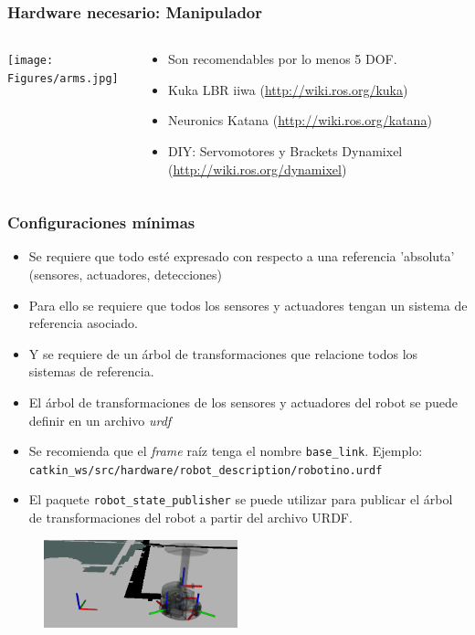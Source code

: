 \documentclass[10pt,spanish,aspectratio=1610]{beamer}
\begin{document}
\begin{frame}\frametitle{Hardware necesario: Manipulador}
  \begin{columns}
    \begin{column}{0.4\textwidth}
      \texttt{[image: Figures/arms.jpg]}
    \end{column}
    \begin{column}{0.5\textwidth}
      \begin{itemize}
      \item Son recomendables por lo menos 5 DOF.
      \item Kuka LBR iiwa (\url{http://wiki.ros.org/kuka})
      \item Neuronics Katana (\url{http://wiki.ros.org/katana})
      \item DIY: Servomotores y Brackets Dynamixel (\url{http://wiki.ros.org/dynamixel})
      \end{itemize}
    \end{column}
  \end{columns}
\end{frame}

\begin{frame}\frametitle{Configuraciones mínimas}
  \begin{itemize}
  \item Se requiere que todo esté expresado con respecto a una referencia 'absoluta' (sensores, actuadores, detecciones)
  \item Para ello se requiere que todos los sensores y actuadores tengan un sistema de referencia asociado.
  \item Y se requiere de un árbol de transformaciones que relacione todos los sistemas de referencia.
  \item El árbol de transformaciones de los sensores y actuadores del robot se puede definir en un archivo \textit{urdf}
  \item Se recomienda que el \textit{frame} raíz tenga el nombre \texttt{base\_link}. Ejemplo: \texttt{catkin\_ws/src/hardware/robot\_description/robotino.urdf}
  \item El paquete \texttt{robot\_state\_publisher} se puede utilizar para publicar el árbol de transformaciones del robot a partir del archivo URDF.
  \end{itemize}
  \begin{figure}
    \centering
    \includegraphics[width=0.5\textwidth]{Figures/robotino_tf.png}
  \end{figure}
\end{frame}
\end{document}
